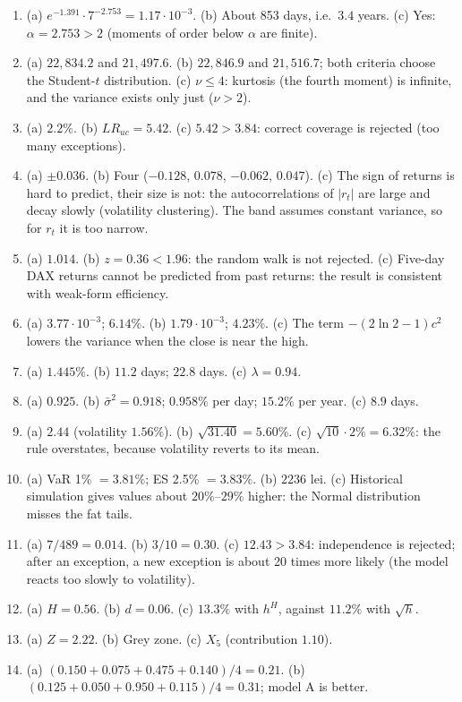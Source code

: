 \documentclass[10.5pt]{article}
\begin{document}
{\begin{enumerate}[label=\textbf{\arabic*.},leftmargin=2.2em,itemsep=0.25ex]
appears.
\item (a) $e^{-1.391}\cdot 7^{-2.753}=1.17\cdot 10^{-3}$. (b) About 853 days, i.e.\ $3.4$ years. (c) Yes:
$\alpha=2.753>2$ (moments of order below $\alpha$ are finite).
\item (a) $22{,}834.2$ and $21{,}497.6$. (b) $22{,}846.9$ and $21{,}516.7$; both criteria choose the Student-$t$
distribution. (c) $\nu\le 4$: kurtosis (the fourth moment) is infinite, and the variance exists only just ($\nu>2$).
\item (a) $2.2\%$. (b) $LR_{uc}=5.42$. (c) $5.42>3.84$: correct coverage is rejected (too many exceptions).
\item (a) $\pm 0.036$. (b) Four ($-0.128$, $0.078$, $-0.062$, $0.047$). (c) The sign of returns is hard to predict,
their size is not: the autocorrelations of $|r_t|$ are large and decay slowly (volatility clustering). The band
assumes constant variance, so for $r_t$ it is too narrow.
\item (a) $1.014$. (b) $z=0.36<1.96$: the random walk is not rejected. (c) Five-day DAX returns cannot be predicted
from past returns: the result is consistent with weak-form efficiency.
\item (a) $3.77\cdot 10^{-3}$; $6.14\%$. (b) $1.79\cdot 10^{-3}$; $4.23\%$. (c) The term $-(2\ln 2-1)c^2$ lowers the
variance when the close is near the high.
\item (a) $1.445\%$. (b) $11.2$ days; $22.8$ days. (c) $\lambda=0.94$.
\item (a) $0.925$. (b) $\bar\sigma^2=0.918$; $0.958\%$ per day; $15.2\%$ per year. (c) $8.9$ days.
\item (a) $2.44$ (volatility $1.56\%$). (b) $\sqrt{31.40}=5.60\%$. (c) $\sqrt{10}\cdot 2\%=6.32\%$: the rule
overstates, because volatility reverts to its mean.
\item (a) VaR 1\% $=3.81\%$; ES 2.5\% $=3.83\%$. (b) $2236$ lei. (c) Historical simulation gives values about
$20\%$--$29\%$ higher: the Normal distribution misses the fat tails.
\item (a) $7/489=0.014$. (b) $3/10=0.30$. (c) $12.43>3.84$: independence is rejected; after an exception, a new
exception is about 20 times more likely (the model reacts too slowly to volatility).
\item (a) $H=0.56$. (b) $d=0.06$. (c) $13.3\%$ with $h^H$, against $11.2\%$ with $\sqrt h$.
\item (a) $Z=2.22$. (b) Grey zone. (c) $X_5$ (contribution $1.10$).
\item (a) $(0.150+0.075+0.475+0.140)/4=0.21$. (b) $(0.125+0.050+0.950+0.115)/4=0.31$; model A is better.

\end{enumerate}}
\end{document}

